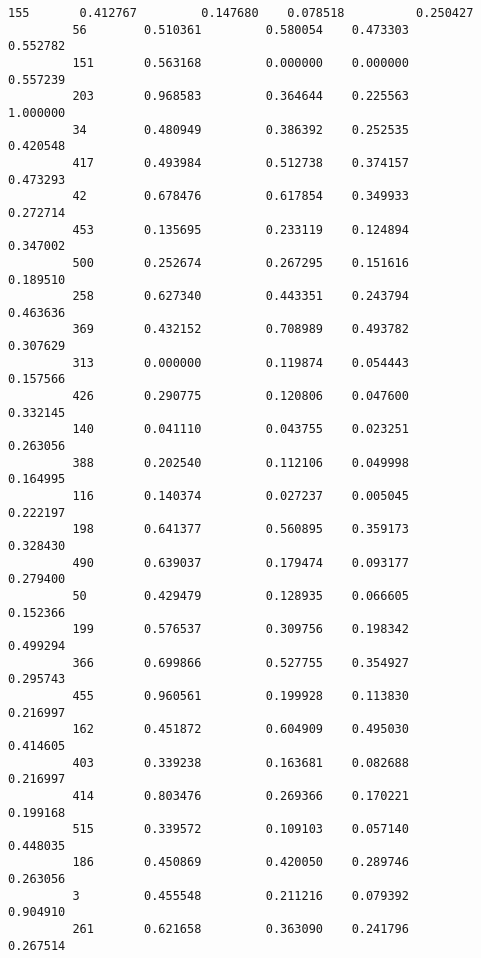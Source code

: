 \documentclass[11pt]{article}
\begin{document}
\begin{Verbatim}[commandchars=\\\{\}]
         155       0.412767         0.147680    0.078518          0.250427   
         56        0.510361         0.580054    0.473303          0.552782   
         151       0.563168         0.000000    0.000000          0.557239   
         203       0.968583         0.364644    0.225563          1.000000   
         34        0.480949         0.386392    0.252535          0.420548   
         417       0.493984         0.512738    0.374157          0.473293   
         42        0.678476         0.617854    0.349933          0.272714   
         453       0.135695         0.233119    0.124894          0.347002   
         500       0.252674         0.267295    0.151616          0.189510   
         258       0.627340         0.443351    0.243794          0.463636   
         369       0.432152         0.708989    0.493782          0.307629   
         313       0.000000         0.119874    0.054443          0.157566   
         426       0.290775         0.120806    0.047600          0.332145   
         140       0.041110         0.043755    0.023251          0.263056   
         388       0.202540         0.112106    0.049998          0.164995   
         116       0.140374         0.027237    0.005045          0.222197   
         198       0.641377         0.560895    0.359173          0.328430   
         490       0.639037         0.179474    0.093177          0.279400   
         50        0.429479         0.128935    0.066605          0.152366   
         199       0.576537         0.309756    0.198342          0.499294   
         366       0.699866         0.527755    0.354927          0.295743   
         455       0.960561         0.199928    0.113830          0.216997   
         162       0.451872         0.604909    0.495030          0.414605   
         403       0.339238         0.163681    0.082688          0.216997   
         414       0.803476         0.269366    0.170221          0.199168   
         515       0.339572         0.109103    0.057140          0.448035   
         186       0.450869         0.420050    0.289746          0.263056   
         3         0.455548         0.211216    0.079392          0.904910   
         261       0.621658         0.363090    0.241796          0.267514   
         

\end{Verbatim}
\end{document}
